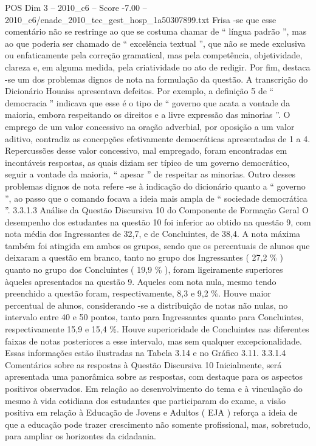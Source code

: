 \begin{textsample}{POS Dim 3 – 2010\_c6 – Score -7.00 – 2010\_c6/enade\_2010\_tec\_gest\_hosp\_1a50307899.txt}
Frisa -se que esse comentário não se restringe ao que se costuma chamar de “ língua padrão ”, mas ao que poderia ser chamado de “ excelência textual ”, que não se mede exclusiva ou enfaticamente pela correção gramatical, mas pela competência, objetividade, clareza e, em alguma medida, pela criatividade no ato de redigir.
Por fim, destaca -se um dos problemas dignos de nota na formulação da questão.
A transcrição do Dicionário Houaiss apresentava defeitos.
Por exemplo, a definição 5 de “ democracia ” indicava que esse é o tipo de “ governo que acata a vontade da maioria, embora respeitando os direitos e a livre expressão das minorias ”.
O emprego de um valor concessivo na oração adverbial, por oposição a um valor aditivo, contradiz as concepções efetivamente democráticas apresentadas de 1 a 4.
Repercussões desse valor concessivo, mal empregado, foram encontradas em incontáveis respostas, as quais diziam ser típico de um governo democrático, seguir a vontade da maioria, “ apesar ” de respeitar as minorias.
Outro desses problemas dignos de nota refere -se à indicação do dicionário quanto a “ governo ”, ao passo que o comando focava a ideia mais ampla de “ sociedade democrática ”. 3.3.1.3 Análise da Questão Discursiva 10 do Componente de Formação Geral O desempenho dos estudantes na questão 10 foi inferior ao obtido na questão 9, com nota média dos Ingressantes de 32,7, e de Concluintes, de 38,4.
A nota máxima também foi atingida em ambos os grupos, sendo que os percentuais de alunos que deixaram a questão em branco, tanto no grupo dos Ingressantes ( 27,2 \% ) quanto no grupo dos Concluintes ( 19,9 \% ), foram ligeiramente superiores àqueles apresentados na questão 9.
Aqueles com nota nula, mesmo tendo preenchido a questão foram, respectivamente, 8,3 e 9,2 \%.
Houve maior percentual de alunos, considerando -se a distribuição de notas não nulas, no intervalo entre 40 e 50 pontos, tanto para Ingressantes quanto para Concluintes, respectivamente 15,9 e 15,4 \%.
Houve superioridade de Concluintes nas diferentes faixas de notas posteriores a esse intervalo, mas sem qualquer excepcionalidade.
Essas informações estão ilustradas na Tabela 3.14 e no Gráfico 3.11. 3.3.1.4 Comentários sobre as respostas à Questão Discursiva 10 Inicialmente, será apresentada uma panorâmica sobre as respostas, com destaque para os aspectos positivos observados.
Em relação ao desenvolvimento do tema e à vinculação do mesmo à vida cotidiana dos estudantes que participaram do exame, a visão positiva em relação à Educação de Jovens e Adultos ( EJA ) reforça a ideia de que a educação pode trazer crescimento não somente profissional, mas, sobretudo, para ampliar os horizontes da cidadania.

\end{textsample}
